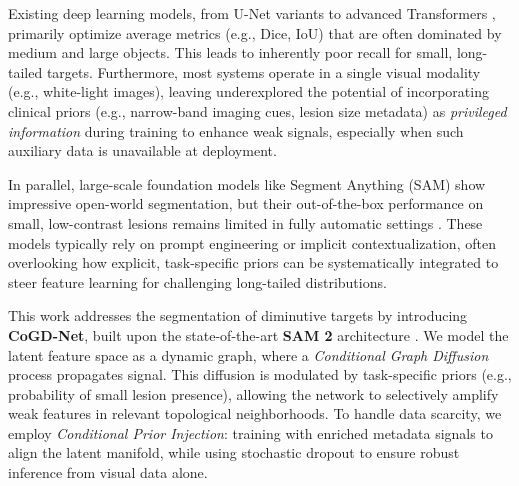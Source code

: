 \documentclass{article}
\begin{document}
Existing deep learning models, from U-Net variants \cite{Ronneberger2015UNet,Fan2020PraNet} to advanced Transformers \cite{Xie2021SegFormer,Duc2022ColonFormer}, primarily optimize average metrics (e.g., Dice, IoU) that are often dominated by medium and large objects. This leads to inherently poor recall for small, long-tailed targets. Furthermore, most systems operate in a single visual modality (e.g., white-light images), leaving underexplored the potential of incorporating clinical priors (e.g., narrow-band imaging cues, lesion size metadata) as \emph{privileged information} during training to enhance weak signals, especially when such auxiliary data is unavailable at deployment.

In parallel, large-scale foundation models like Segment Anything (SAM) \cite{Kirillov2023SAM} show impressive open-world segmentation, but their out-of-the-box performance on small, low-contrast lesions remains limited in fully automatic settings \cite{Ma2023MedSAM}. These models typically rely on prompt engineering or implicit contextualization, often overlooking how explicit, task-specific priors can be systematically integrated to steer feature learning for challenging long-tailed distributions.

This work addresses the segmentation of diminutive targets by introducing \textbf{CoGD-Net}, built upon the state-of-the-art \textbf{SAM 2} architecture \cite{Ravi2024SAM2}. We model the latent feature space as a dynamic graph, where a \emph{Conditional Graph Diffusion} process propagates signal. This diffusion is modulated by task-specific priors (e.g., probability of small lesion presence), allowing the network to selectively amplify weak features in relevant topological neighborhoods. To handle data scarcity, we employ \emph{Conditional Prior Injection}: training with enriched metadata signals to align the latent manifold, while using stochastic dropout to ensure robust inference from visual data alone.
\end{document}
